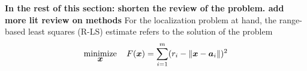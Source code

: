 \textbf{In the rest of this section: shorten the review of the problem. add more lit review on methods}
For the localization problem at hand, the range-based least squares (R-LS) estimate refers to the solution of the problem
\begin{equation}\label{eq:4.2} %
\Min_{\Bx} \quad F(\Bx)=\sum_{i=1}^{m} (r_i - \|{\Bx} - {\Ba}_i\|)^2
\end{equation}

%


